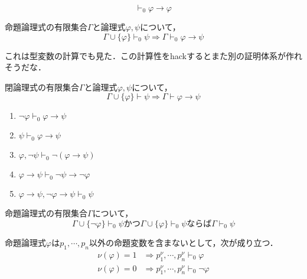 \documentclass[uplatex, 12pt, dvipdfmx]{jsreport}
\begin{document}
\begin{lemma}
    \[\vdash_0\varphi\to\varphi\]
\end{lemma}

\begin{theorem}
    命題論理式の有限集合$\Gamma$と論理式$\varphi,\psi$について，
    \[ \Gamma\cup\{\varphi\}\vdash_0\psi\Rightarrow\Gamma\vdash_0\varphi\to\psi \]
\end{theorem}
\begin{remark}
    これは型変数の計算でも見た．この計算性をhackするとまた別の証明体系が作れそうだな．
\end{remark}

\begin{corollary}
    閉論理式の有限集合$\Gamma$と論理式$\varphi,\psi$について，
    \[ \Gamma\cup\{\varphi\}\vdash\psi\Rightarrow\Gamma\vdash\varphi\to\psi \]
\end{corollary}

\begin{lemma}\mbox{}
    \begin{enumerate}
        \item $\lnot\varphi\vdash_0\varphi\to\psi$
        \item $\psi\vdash_0\varphi\to\psi$
        \item $\varphi,\lnot\psi\vdash_0\lnot(\varphi\to\psi)$
        \item $\varphi\to\psi\vdash_0\lnot\psi\to\lnot\varphi$
        \item $\varphi\to\psi,\lnot\varphi\to\psi\vdash_0\psi$
    \end{enumerate}
\end{lemma}

\begin{lemma}
    命題論理式の有限集合$\Gamma$について，
    \[ \Gamma\cup\{\lnot\varphi\}\vdash_0\psi かつ\Gamma\cup\{\varphi\}\vdash_0\psi ならば \Gamma\vdash_0\psi \]
\end{lemma}

\begin{lemma}
    命題論理式$\varphi$は$p_1,\cdots,p_n$以外の命題変数を含まないとして，次が成り立つ．
    \begin{align*}
        \nu(\varphi)=1&\Rightarrow p_1^\nu,\cdots,p_n^\nu\vdash_0\varphi\\
        \nu(\varphi)=0&\Rightarrow p_1^\nu,\cdots,p^\nu_n\vdash_0\lnot\varphi
    \end{align*}
\end{lemma}
\end{document}
